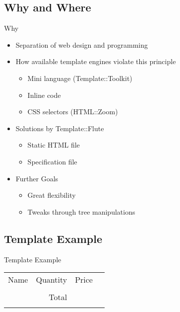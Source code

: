 \subsection{Why and Where}
\begin{frame}{Why}
  \begin{itemize}
  \item Separation of web design and programming
  \item How available template engines violate this principle
    \begin{itemize}
    \item Mini language (Template::Toolkit)
    \item Inline code
    \item CSS selectors (HTML::Zoom)
    \end{itemize}
  \item Solutions by Template::Flute
    \begin{itemize}
      \item Static HTML file
      \item Specification file
    \end{itemize}
  \item Further Goals
    \begin{itemize}
    \item Great flexibility
    \item Tweaks through tree manipulations
    \end{itemize}
  \end{itemize}
\end{frame}


\subsection{Template Example}
\begin{frame}{Template Example}
\begin{tabular}[t]{rrrr}
\hfill Name & Quantity & Price \\
\hfill & & \\
\hfill & Total & \\
\hfill & & \\
\end{tabular}
\end{frame}

